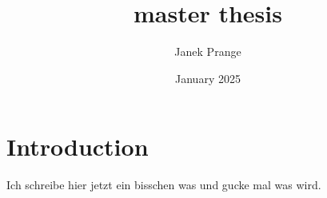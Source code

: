 \documentclass{article}
\title{master thesis}
\author{Janek Prange}
\date{January 2025}
\begin{document}
\maketitle

\section{Introduction}

Ich schreibe hier jetzt ein bisschen was und gucke mal was wird.
\end{document}

